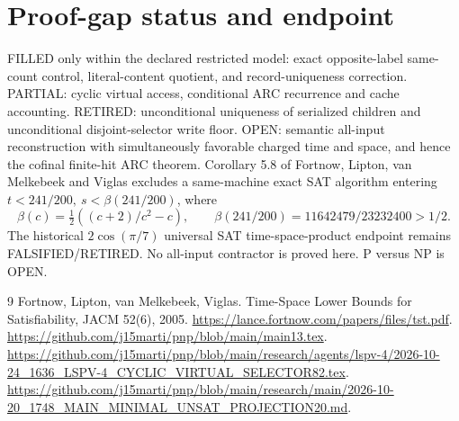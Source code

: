 \documentclass[11pt]{article}
\begin{document}
\section{Proof-gap status and endpoint}
FILLED only within the declared restricted model: exact opposite-label same-count control, literal-content quotient, and record-uniqueness correction. PARTIAL: cyclic virtual access, conditional ARC recurrence and cache accounting. RETIRED: unconditional uniqueness of serialized children and unconditional disjoint-selector write floor. OPEN: semantic all-input reconstruction with simultaneously favorable charged time and space, and hence the cofinal finite-hit ARC theorem.
Corollary 5.8 of Fortnow, Lipton, van Melkebeek and Viglas excludes a same-machine exact SAT algorithm entering \(t<241/200,\ s<\beta(241/200)\), where
\[
\beta(c)=\tfrac12((c+2)/c^2-c),\qquad
\beta(241/200)=11642479/23232400>1/2.
\]
The historical \(2\cos(\pi/7)\) universal SAT time-space-product endpoint remains FALSIFIED/RETIRED. No all-input contractor is proved here. P versus NP is OPEN.

\begin{thebibliography}{9}
 Fortnow, Lipton, van Melkebeek, Viglas. Time-Space Lower Bounds for Satisfiability, JACM 52(6), 2005. \url{https://lance.fortnow.com/papers/files/tst.pdf}.
 \url{https://github.com/j15marti/pnp/blob/main/main13.tex}.
 \url{https://github.com/j15marti/pnp/blob/main/research/agents/lspv-4/2026-10-24_1636_LSPV-4_CYCLIC_VIRTUAL_SELECTOR82.tex}.
 \url{https://github.com/j15marti/pnp/blob/main/research/main/2026-10-20_1748_MAIN_MINIMAL_UNSAT_PROJECTION20.md}.
\end{thebibliography}
\end{document}
